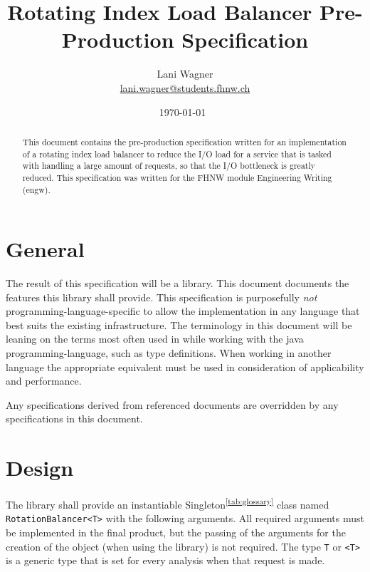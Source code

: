 \documentclass[11pt]{article} %
\title{Rotating Index Load Balancer Pre-Production Specification}
\author{Lani Wagner\\\href{mailto:lani.wagner@students.fhnw.ch}{lani.wagner@students.fhnw.ch}}
\date{\today\ \currenttime} %
\begin{document}
    \VerbatimFootnotes
    \clearpage\maketitle
    \thispagestyle{empty}
    \begin{abstract}
        This document contains the pre-production specification written for an implementation of a rotating index
        load balancer to reduce the I/O load for a service that is tasked with handling a large amount of requests,
        so that the I/O bottleneck is greatly reduced. This specification was written for the FHNW module Engineering
        Writing (engw).
    \end{abstract}
    {\hypersetup{hidelinks} \tableofcontents}
    \newpage


    \section{General}

    The result of this specification will be a library. This document documents the features this library shall provide. This specification is purposefully \textit{not} programming-language-specific to allow the implementation in any language that best suits the existing infrastructure. The terminology in this document will be leaning on the terms most often used in while working with the java programming-language, such as type definitions. When working in another language the appropriate equivalent must be used in consideration of applicability and performance.

    Any specifications derived from referenced documents are overridden by any specifications in this document.


    \section{Design}

    The library shall provide an instantiable Singleton\textsuperscript{\ref{tab:glossary}} class named
    \verb|RotationBalancer<T>| with the following arguments. All required arguments must be implemented in the final
    product, but the passing of the arguments for the creation of the object (when using the library) is not required. The type \verb|T| or
    \verb|<T>| is a generic type that is set for every analysis when that request is made.
\end{document}
